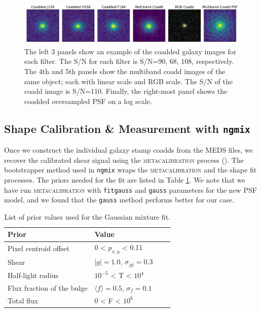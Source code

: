 \documentclass[fleqn,usenatbib]{mnras}
\begin{document}
\begin{figure}
	\includegraphics[width=\textwidth]{coadd_galaxy_example_log.pdf}
    \caption{The left 3 panels show an example of the coadded galaxy images for each filter. The S/N for each filter is S/N=90, 68, 108, respectively. The 4th and 5th panels show the multiband coadd images of the same object; each with linear scale and RGB scale. The S/N of the coadd image is S/N=110. Finally, the right-most panel shows the coadded oversampled PSF on a log scale.}
    \label{fig:single_to_coadd_rgb}
\end{figure}

\par

\subsection{Shape Calibration \& Measurement with \texttt{ngmix}}
\label{subsec:mcal}
Once we construct the individual galaxy stamp coadds from the MEDS files, we recover the calibrated shear signal using the \textsc{metacalibration} process (\citealt{2017arXiv170202600H, 2017ApJ...841...24S}). The bootstrapper method used in \texttt{ngmix} wraps the \textsc{metacalibration} and the shape fit processes. The priors needed for the fit are listed in Table \ref{tab:priors}. We note that we have run \textsc{metacalibration} with \texttt{fitgauss} and \texttt{gauss} parameters for the new PSF model, and we found that the \texttt{gauss} method performs better for our case.

\begin{table}
    \centering
    \begin{tabular}{|p{3cm}||p{3cm}|p{3cm}|p{3cm}|}
    \hline
    Prior & Value \\
    \hline
    Pixel centroid offset & 0 < $p_{x,y}$ < 0.11\\
    Shear & $|g|=1.0$, $\sigma_{|g|} = 0.3$\\
    Half-light radius & $10^{-5}$ < T < $10^{4}$\\
    Flux fraction of the bulge  & $\langle f\rangle = 0.5$, $\sigma_{f} = 0.1$\\
    Total flux & $0$ < F < $10^{6}$\\
    \hline
    \end{tabular}
    \caption{List of prior values used for the Gaussian mixture fit.}
    \label{tab:priors}
\end{table}
\end{document}
